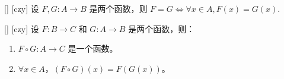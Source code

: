\documentclass[UTF8]{ctexart}
\begin{document}
        \begin{ppt}
            [UUID]
            {}
            []
            [czy]
            设 \( F, G: A \rightarrow B \) 是两个函数，则 \( F = G \Longleftrightarrow\forall x \in A , F(x) = G(x) \).
        \end{ppt}

        \begin{thm}
            [UUID]
            {}
            []
            [czy]
            设 \( F: B \rightarrow C \) 和 \( G: A \rightarrow B \) 是两个函数，则：
            \begin{enumerate}
                \item \( F \circ G: A \rightarrow C \) 是一个函数。
                \item \(\forall x \in A \)，\( (F \circ G)(x) = F(G(x)) \)。
            \end{enumerate}
        \end{thm}
    
\end{document}
